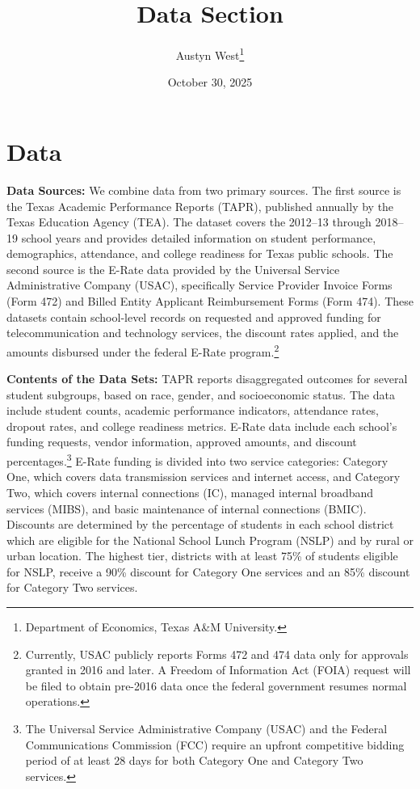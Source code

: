 


\begin{singlespace}
\title{Data Section}
\author{Austyn West\thanks{Department of Economics, Texas A\&M University.}}
\date{October 30, 2025}
\maketitle
\end{singlespace}

\section*{Data}

\textbf{Data Sources:} We combine data from two primary sources. The first source is the Texas Academic Performance Reports (TAPR), published annually by the Texas Education Agency (TEA). The dataset covers the 2012--13 through 2018--19 school years and provides detailed information on student performance, demographics, attendance, and college readiness for Texas public schools. The second source is the E-Rate data provided by the Universal Service Administrative Company (USAC), specifically Service Provider Invoice Forms (Form 472) and Billed Entity Applicant Reimbursement Forms (Form 474). These datasets contain school-level records on requested and approved funding for telecommunication and technology services, the discount rates applied, and the amounts disbursed under the federal E-Rate program.\footnote{Currently, USAC publicly reports Forms 472 and 474 data only for approvals granted in 2016 and later. A Freedom of Information Act (FOIA) request will be filed to obtain pre-2016 data once the federal government resumes normal operations.}

\textbf{Contents of the Data Sets:} TAPR reports disaggregated outcomes for several student subgroups, based on race, gender, and socioeconomic status. The data include student counts, academic performance indicators, attendance rates, dropout rates, and college readiness metrics. E-Rate data include each school's funding requests, vendor information, approved amounts, and discount percentages.\footnote{The Universal Service Administrative Company (USAC) and the Federal Communications Commission (FCC) require an upfront competitive bidding period of at least 28 days for both Category One and Category Two services.} E-Rate funding is divided into two service categories: Category One, which covers data transmission services and internet access, and Category Two, which covers internal connections (IC), managed internal broadband services (MIBS), and basic maintenance of internal connections (BMIC). Discounts are determined by the percentage of students in each school district which are eligible for the National School Lunch Program (NSLP) and by rural or urban location. The highest tier, districts with at least 75\% of students eligible for NSLP, receive a 90\% discount for Category One services and an 85\% discount for Category Two services.

